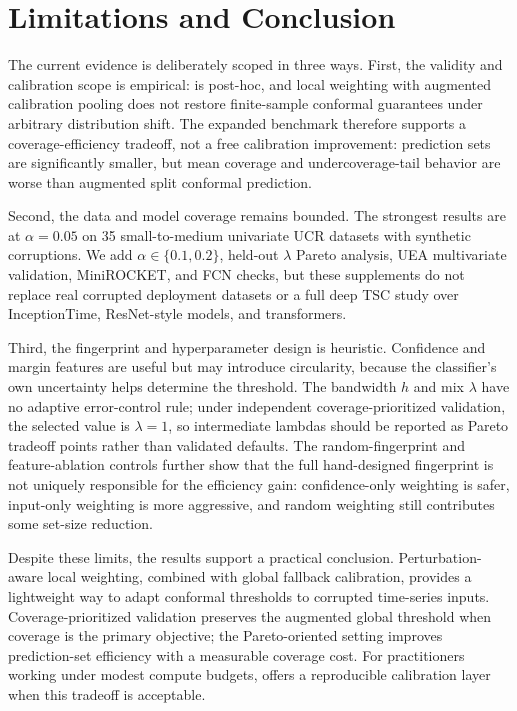 \section{Limitations and Conclusion}

The current evidence is deliberately scoped in three ways. First, the validity and calibration scope is empirical: \fastcp{} is post-hoc, and local weighting with augmented calibration pooling does not restore finite-sample conformal guarantees under arbitrary distribution shift. The expanded benchmark therefore supports a coverage-efficiency tradeoff, not a free calibration improvement: prediction sets are significantly smaller, but mean coverage and undercoverage-tail behavior are worse than augmented split conformal prediction.

Second, the data and model coverage remains bounded. The strongest results are at $\alpha=0.05$ on 35 small-to-medium univariate UCR datasets with synthetic corruptions. We add $\alpha\in\{0.1,0.2\}$, held-out $\lambda$ Pareto analysis, UEA multivariate validation, MiniROCKET, and FCN checks, but these supplements do not replace real corrupted deployment datasets or a full deep TSC study over InceptionTime, ResNet-style models, and transformers.

Third, the fingerprint and hyperparameter design is heuristic. Confidence and margin features are useful but may introduce circularity, because the classifier's own uncertainty helps determine the threshold. The bandwidth $h$ and mix $\lambda$ have no adaptive error-control rule; under independent coverage-prioritized validation, the selected value is $\lambda=1$, so intermediate lambdas should be reported as Pareto tradeoff points rather than validated defaults. The random-fingerprint and feature-ablation controls further show that the full hand-designed fingerprint is not uniquely responsible for the efficiency gain: confidence-only weighting is safer, input-only weighting is more aggressive, and random weighting still contributes some set-size reduction.

Despite these limits, the results support a practical conclusion. Perturbation-aware local weighting, combined with global fallback calibration, provides a lightweight way to adapt conformal thresholds to corrupted time-series inputs. Coverage-prioritized validation preserves the augmented global threshold when coverage is the primary objective; the Pareto-oriented setting improves prediction-set efficiency with a measurable coverage cost. For practitioners working under modest compute budgets, \fastcp{} offers a reproducible calibration layer when this tradeoff is acceptable.
